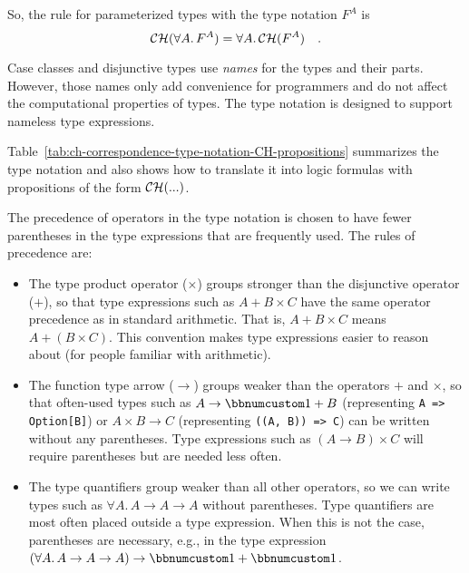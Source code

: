 So, the rule for parameterized types with the type notation $F^{A}$
is
\[
{\cal CH}(\forall A.\,F^{A})=\forall A.\,{\cal CH}(F^{A})\quad.
\]

Case classes and disjunctive types use \emph{names} for the types
and their parts. However, those names only add convenience for programmers
and do not affect the computational properties of types. The type
notation is designed to support nameless type expressions.

Table~\ref{tab:ch-correspondence-type-notation-CH-propositions}
summarizes the type notation and also shows how to translate it into
logic formulas with propositions of the form ${\cal CH}(...)$.

The precedence of operators
in the type notation is chosen to have fewer parentheses in the type
expressions that are frequently used. The rules of precedence are:
\begin{itemize}
\item The type product operator ($\times$) groups stronger than the disjunctive
operator ($+$), so that type expressions such as $A+B\times C$ have
the same operator precedence as in standard arithmetic. That is, $A+B\times C$
means $A+\left(B\times C\right)$. This convention makes type expressions
easier to reason about (for people familiar with arithmetic).
\item The function type arrow ($\rightarrow$) groups weaker than the operators
$+$ and $\times$, so that often-used types such as $A\rightarrow\bbnum 1+B$
(representing \lstinline!A => Option[B]!) or $A\times B\rightarrow C$
(representing \lstinline!((A, B)) => C!) can be written without any
parentheses. Type expressions such as $\left(A\rightarrow B\right)\times C$
will require parentheses but are needed less often.
\item The type quantifiers group weaker than all other operators, so we
can write types such as $\forall A.\,A\rightarrow A\rightarrow A$
without parentheses. Type quantifiers are most often placed outside
a type expression. When this is not the case, parentheses are necessary,
e.g., in the type expression $\left(\forall A.\,A\rightarrow A\rightarrow A\right)\rightarrow\bbnum 1+\bbnum 1$.
\end{itemize}
